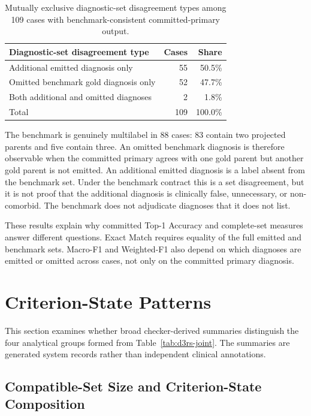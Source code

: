 \begin{table}[htbp]
\centering
\caption{Mutually exclusive diagnostic-set disagreement types among 109 cases with benchmark-consistent committed-primary output.}
\label{tab:ch8-diagnostic-set-errors}
\small
\begin{tabularx}{\textwidth}{|>{\raggedright\arraybackslash}X|r|r|}
\hline
\textbf{Diagnostic-set disagreement type} & \textbf{Cases} & \textbf{Share}\\
\hline
Additional emitted diagnosis only & 55 & 50.5\%\\
\hline
Omitted benchmark gold diagnosis only & 52 & 47.7\%\\
\hline
Both additional and omitted diagnoses & 2 & 1.8\%\\
\hline
Total & 109 & 100.0\%\\
\hline
\end{tabularx}
\end{table}

The benchmark is genuinely multilabel in 88 cases: 83 contain two projected parents and five contain three. An omitted benchmark diagnosis is therefore observable when the committed primary agrees with one gold parent but another gold parent is not emitted. An additional emitted diagnosis is a label absent from the benchmark set. Under the benchmark contract this is a set disagreement, but it is not proof that the additional diagnosis is clinically false, unnecessary, or non-comorbid. The benchmark does not adjudicate diagnoses that it does not list.

These results explain why committed Top-1 Accuracy and complete-set measures answer different questions. Exact Match requires equality of the full emitted and benchmark sets. Macro-F1 and Weighted-F1 also depend on which diagnoses are emitted or omitted across cases, not only on the committed primary diagnosis.

\section{Criterion-State Patterns}
\label{sec:ch8-criterion-evidence}

This section examines whether broad checker-derived summaries distinguish the four analytical groups formed from Table~\ref{tab:d3rs-joint}. The summaries are generated system records rather than independent clinical annotations.

\subsection{Compatible-Set Size and Criterion-State Composition}

